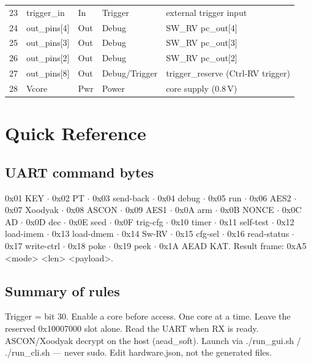 \documentclass[11pt,a4paper]{report}
\newcommand{\code}[1]{{\ttfamily\small #1}}
\begin{document}
\begin{center}
\begin{longtable}{clllp{5.3cm}}
23 & \code{trigger\_in} & In & Trigger & external trigger input \\
24 & \code{out\_pins[4]} & Out & Debug & \code{SW\_RV pc\_out[4]} \\
25 & \code{out\_pins[3]} & Out & Debug & \code{SW\_RV pc\_out[3]} \\
26 & \code{out\_pins[2]} & Out & Debug & \code{SW\_RV pc\_out[2]} \\
27 & \code{out\_pins[8]} & Out & Debug/Trigger & \code{trigger\_reserve} (Ctrl-RV trigger) \\
28 & \code{Vcore} & Pwr & Power & core supply (0.8\,V) \\
\bottomrule
\end{longtable}\end{center}

\chapter{Quick Reference}
\section{UART command bytes}
\code{0x01} KEY $\cdot$ \code{0x02} PT $\cdot$ \code{0x03} send-back $\cdot$
\code{0x04} debug $\cdot$ \code{0x05} run $\cdot$ \code{0x06} AES2 $\cdot$
\code{0x07} Xoodyak $\cdot$ \code{0x08} ASCON $\cdot$ \code{0x09} AES1 $\cdot$
\code{0x0A} arm $\cdot$ \code{0x0B} NONCE $\cdot$ \code{0x0C} AD $\cdot$
\code{0x0D} dec $\cdot$ \code{0x0E} seed $\cdot$ \code{0x0F} trig-cfg $\cdot$
\code{0x10} timer $\cdot$ \code{0x11} self-test $\cdot$ \code{0x12} load-imem $\cdot$
\code{0x13} load-dmem $\cdot$ \code{0x14} Sw-RV $\cdot$ \code{0x15} cfg-sel $\cdot$
\code{0x16} read-status $\cdot$ \code{0x17} write-ctrl $\cdot$ \code{0x18} poke $\cdot$
\code{0x19} peek $\cdot$ \code{0x1A} AEAD KAT.
Result frame: \code{0xA5 <mode> <len> <payload>}.

\section{Summary of rules}
Trigger = bit 30. Enable a core before access. One core at a time. Leave the
reserved \code{0x10007000} slot alone. Read the UART when RX is ready.
ASCON/Xoodyak decrypt on the host (\code{aead\_soft}). Launch via
\code{./run\_gui.sh} / \code{./run\_cli.sh} --- never \code{sudo}. Edit
\code{hardware.json}, not the generated files.
\end{document}

